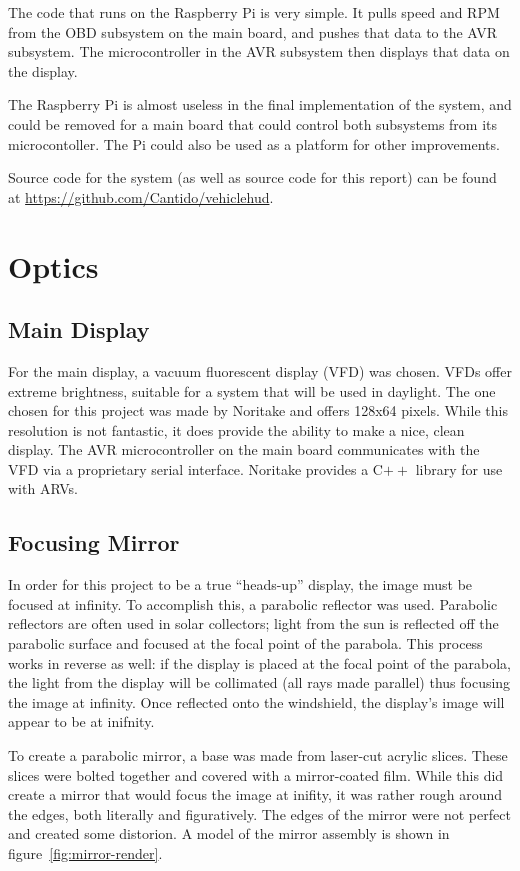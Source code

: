 The code that runs on the Raspberry Pi is very simple. It pulls speed and RPM
from the OBD subsystem on the main board, and pushes that data to the AVR
subsystem. The microcontroller in the AVR subsystem then displays that data
on the display.

The Raspberry Pi is almost useless in the final implementation of the system, and
could be removed for a main board that could control both subsystems from its
microcontoller. The Pi could also be used as a platform for other improvements.

Source code for the system (as well as source code for this report) can be
found at \url{https://github.com/Cantido/vehiclehud}.

\section{Optics}
\subsection{Main Display}
For the main display, a vacuum fluorescent display (VFD) was chosen.  VFDs offer
extreme brightness, suitable for a system that will be used in daylight.  The
one chosen for this project was made by Noritake and offers 128x64 pixels.  
While this resolution is not fantastic, it does provide the ability to make a
nice, clean display.  The AVR microcontroller on the main board communicates 
with the VFD via a proprietary serial interface.  Noritake provides a C$++$ 
library for use with ARVs.

\subsection{Focusing Mirror}
In order for this project to be a true ``heads-up'' 
display, the image must be focused at infinity.  To accomplish this, a 
parabolic reflector was used.  Parabolic reflectors are often used in solar
collectors; light from the sun is reflected off the parabolic surface and
focused at the focal point of the parabola.  This process works in reverse 
as well: if the display is placed at the focal point of the parabola, the
light from the display will be collimated (all rays made parallel) thus
focusing the image at infinity.  Once reflected onto the windshield, the
display's image will appear to be at inifnity.

To create a parabolic mirror, a base was made from laser-cut acrylic slices.
These slices were bolted together and covered with a mirror-coated film.  While
this did create a mirror that would focus the image at inifity, it was rather
rough around the edges, both literally and figuratively.  The edges of the mirror
were not perfect and created some distorion.  A model of the mirror assembly is 
shown in figure~\ref{fig:mirror-render}.

